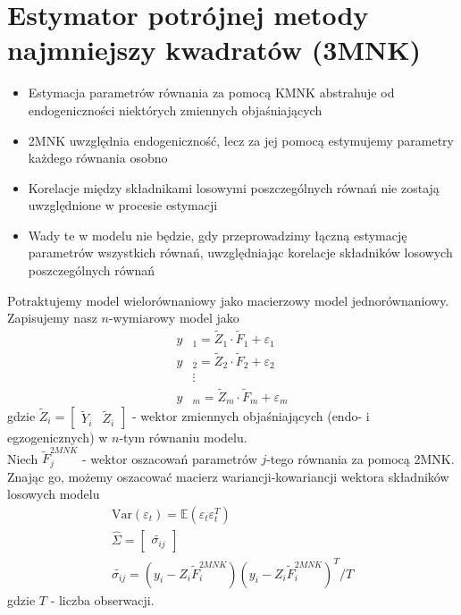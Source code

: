 \section{Estymator potrójnej metody najmniejszy kwadratów (3MNK)}
\begin{itemize}
\item Estymacja parametrów równania za pomocą KMNK abstrahuje od endogeniczności niektórych zmiennych objaśniających
\item 2MNK uwzględnia endogeniczność, lecz za jej pomocą estymujemy parametry każdego równania osobno
\item Korelacje między składnikami losowymi poszczególnych równań nie zostają uwzględnione w procesie estymacji
\item Wady te w modelu nie będzie, gdy przeprowadzimy łączną estymację parametrów wszystkich równań, uwzględniając korelacje składników losowych poszczególnych równań
\end{itemize}
Potraktujemy model wielorównaniowy jako macierzowy model jednorównaniowy. Zapisujemy nasz $ n $-wymiarowy model jako
\begin{align*}
y&_1=\tilde{Z}_1\cdot\tilde{F}_1+\varepsilon_1\\
y&_2=\tilde{Z}_2\cdot\tilde{F}_2+\varepsilon_2\\
&\vdots\\
y&_m=\tilde{Z}_m\cdot\tilde{F}_m+\varepsilon_m
\end{align*}
gdzie $ \tilde{Z}_i=\begin{bmatrix}
\tilde{Y}_i&\tilde{Z}_i
\end{bmatrix} $ - wektor zmiennych objaśniających (endo- i egzogenicznych) w $ n $-tym równaniu modelu.\\
Niech $ \tilde{F}_j^{2MNK} $ - wektor oszacowań parametrów $ j $-tego równania za pomocą 2MNK.\\
Znając go, możemy oszacować macierz wariancji-kowariancji wektora składników losowych modelu
\begin{gather*}
\text{Var}(\varepsilon_t)=\mathbb E \left(\varepsilon_t\varepsilon_t^T\right)\\
\hat \Sigma=
\begin{bmatrix}
\tilde{\sigma_{ij}}
\end{bmatrix}\\
\tilde{\sigma_{ij}}=\left(y_i-Z_i\tilde{F}_i^{2MNK}\right)\left(y_i-Z_i\tilde{F}_i^{2MNK}\right)^T/T
\end{gather*}
gdzie $ T $ - liczba obserwacji.\\

